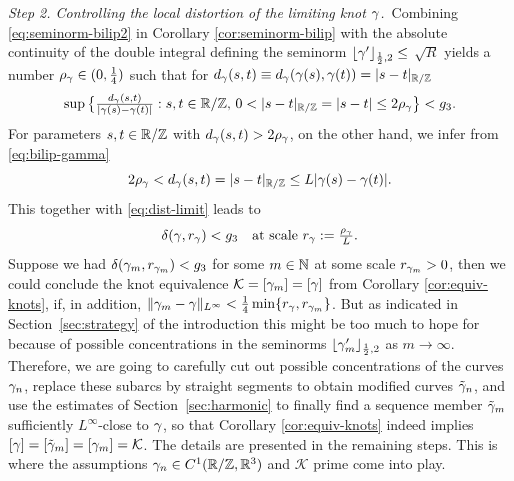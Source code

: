 {\it Step 2. Controlling the local distortion of the limiting  knot $\gamma$.}\,
Combining \eqref{eq:seminorm-bilip2} in Corollary \ref{cor:seminorm-bilip} 
with the absolute
continuity of the double integral defining the seminorm
 $\lfloor\gamma'\rfloor_{\frac12,2}\le$ $\sqrt{R}$ yields a number $\rho_\gamma\in
 (0,\frac14)$ such that for $d_\gamma(s,t)\equiv d_\gamma(\gamma(s),\gamma(t))=|s-t|_{\mathbb{R}/\mathbb{Z}}$
 \begin{equation}\label{eq:dist-limit}
\textstyle
\sup\big\{\frac{d_\g(s,t)}{|\g(s)-\g(t)|}:s,t\in\R/\Z,\,0<|s-t|_{\R/\Z}=
|s-t|\le 2\rho_\g\big\}<g_3.
\end{equation}
For parameters $s,t\in\mathbb{R}/\mathbb{Z}$ with $d_\gamma(s,t)>2\rho_\gamma$, on the
other hand, we infer from \eqref{eq:bilip-gamma}
\[ 2\rho_\gamma<d_\gamma(s,t)=|s-t|_{\mathbb{R}/\mathbb{Z}}\le L|\gamma(s)-\gamma(t)|. \]
This together
with \eqref{eq:dist-limit} leads to 
\begin{equation}\label{eq:local-distortion-limit}
\textstyle
\delta(\gamma,r_\gamma)<g_3\quad\textnormal{at scale
$r_\gamma:=\frac{\rho_\gamma}L.$}
\end{equation}
Suppose we had $\delta(\gamma_m,r_{\gamma_m})<g_3$ for  some $m\in\mathbb{N}$ at some
scale $r_{\gamma_m}>0$, then we could conclude the knot equivalence $
\mathcal{K}=[\gamma_m]=[\gamma]$ from Corollary \ref{cor:equiv-knots},
if, in addition, $\|\gamma_m-\gamma\|_{L^\infty}<\frac14\min\{r_\gamma,r_{\gamma_m}\}$.
But as indicated in Section~\ref{sec:strategy} of the introduction
this might be too much to hope for because of possible 
concentrations in the seminorms $\lfloor \gamma_m'\rfloor_{\frac12,2}$
as $m\to\infty$. Therefore, we are going to carefully
cut out possible
concentrations of the curves $\gamma_n$,
 replace these subarcs by straight segments
to obtain modified curves $\tilde{\gamma}_n$, and use
the estimates of Section~\ref{sec:harmonic} to finally
find a sequence member $\tilde{\gamma}_m$ sufficiently 
$L^\infty$-close to $\gamma$, so that Corollary \ref{cor:equiv-knots}
indeed implies
$[\gamma]=[\tilde{\gamma}_m]=[\gamma_m]=\mathcal{K}$. 
The details are presented in the remaining steps. This is 
where the assumptions $\gamma_n\in C^1(\mathbb{R}/\mathbb{Z},\mathbb{R}^3)$ and $\mathcal{K} $
prime come into play.


